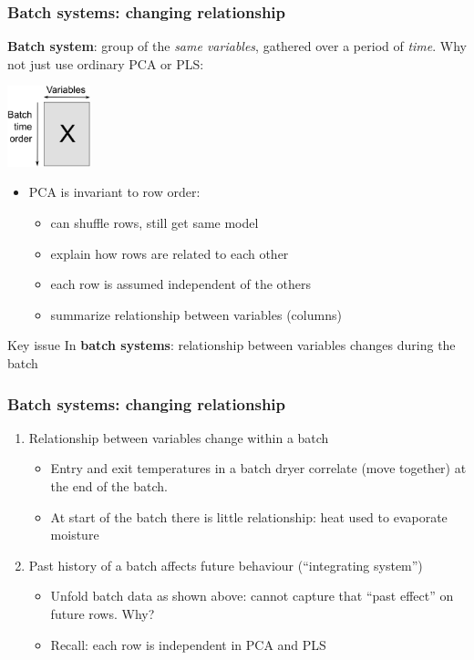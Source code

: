 \begin{frame}\frametitle{Batch systems: changing relationship}

	\textbf{Batch system}: group of the \emph{same variables}, gathered over a period of \emph{time}.  Why not just use ordinary PCA or PLS:

	\begin{center}
		\includegraphics[width=2.4cm]{images/batch-illustrate-unusual-unfolding.png}
	\end{center}


	\begin{itemize}
		\item 	PCA is invariant to row order: 
		\begin{itemize}			
			\item	can shuffle rows, still get same model
			\item 	explain how rows are related to each other
			\item 	each row is assumed independent of the others
			\item 	summarize relationship between variables (columns)
		\end{itemize}
	\end{itemize}

	\begin{exampleblock}{Key issue}
	In \textbf{batch systems}: relationship between variables \alert{changes during the batch}
	\end{exampleblock}
\end{frame}

\begin{frame}\frametitle{Batch systems: changing relationship}

\begin{enumerate}
	\item Relationship between variables change within a batch 
			\begin{itemize}
				\item 	Entry and exit temperatures in a batch dryer correlate (move together) at the end of the batch. 
				\item 	At start of the batch there is little relationship: heat used to evaporate moisture	
			\end{itemize}\pause

	
	\item Past history of a batch affects future behaviour (``integrating system'')
	
			\begin{itemize}
				\item 	Unfold batch data as shown above: cannot capture that ``past effect'' on future rows.  Why?
				\item  	Recall: each row is independent in PCA and PLS
			\end{itemize}

\end{enumerate}
\end{frame}

